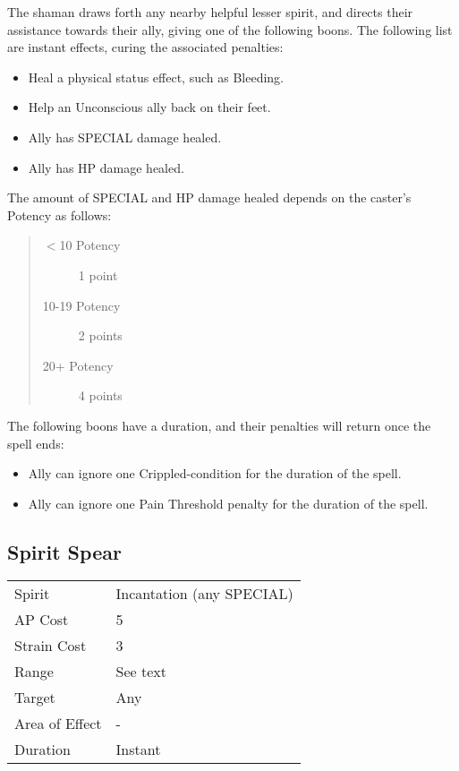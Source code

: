 \documentclass[11pt,a4paper,twocolumn]{book}
\begin{document}
\medskip

The shaman draws forth any nearby helpful lesser spirit, and directs their assistance towards their ally, giving one of the following boons. The following list are instant effects, curing the associated penalties:

\begin{itemize}
	\item Heal a physical status effect, such as Bleeding.
	\item Help an Unconscious ally back on their feet.
	\item Ally has SPECIAL damage healed.
	\item Ally has HP damage healed.
\end{itemize}

The amount of SPECIAL and HP damage healed depends on the caster's Potency as follows:

\begin{quote}
	\begin{description}
		\item[$<$10 Potency] 	1 point
		\item[10-19 Potency] 	2 points
		\item[20+ Potency] 	    4 points
	\end{description}
\end{quote}

The following boons have a duration, and their penalties will return once the spell ends:

\begin{itemize}
	\item Ally can ignore one Crippled-condition for the duration of the spell.
	\item Ally can ignore one Pain Threshold penalty for the duration of the spell.
\end{itemize}

\subsection*{Spirit Spear}
{
	\begin{tabu} to 75mm{| X[l,4] | X[l,7] |}
		\hline
		Spirit         & Incantation (any SPECIAL) \\
		AP Cost        & 5                         \\
		Strain Cost    & 3                         \\
		Range          & See text                  \\
		Target         & Any                       \\
		Area of Effect & -                         \\
		Duration       & Instant                   \\ \hline
	\end{tabu}
	
}
\end{document}
